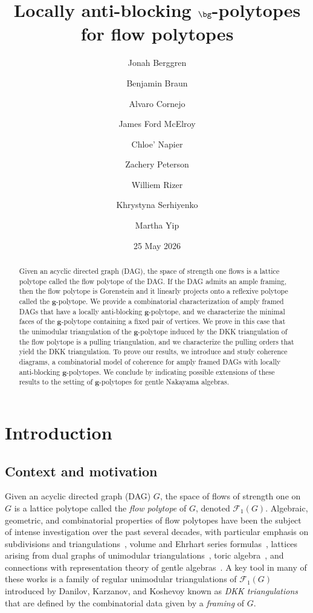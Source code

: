 \documentclass[12pt]{amsart}
\title{Locally anti-blocking $\bg$-polytopes for flow polytopes}
\author[Berggren]{Jonah Berggren}
\author[Braun]{Benjamin Braun}
\author[Cornejo]{Alvaro Cornejo}
\author[McElroy]{James Ford McElroy}
\author[Napier]{Chloe' Napier}
\author[Peterson]{Zachery Peterson}
\author[Rizer]{Williem Rizer}
\author[Serhiyenko]{Khrystyna Serhiyenko}
\author[Yip]{Martha Yip}
\date{25 May 2026}
\theoremstyle{definition}
\newcommand\calF{\mathcal{F}}
\begin{document}
\begin{abstract}
    Given an acyclic directed graph (DAG), the space of strength one flows is a lattice polytope called the flow polytope of the DAG.
    If the DAG admits an ample framing, then the flow polytope is Gorenstein and it linearly projects onto a reflexive polytope called the $\mathbf{g}$-polytope.
    We provide a combinatorial characterization of amply framed DAGs that have a locally anti-blocking $\mathbf{g}$-polytope, and we characterize the minimal faces of the $\mathbf{g}$-polytope containing a fixed pair of vertices.
    We prove in this case that the unimodular triangulation of the $\mathbf{g}$-polytope induced by the DKK triangulation of the flow polytope is a pulling triangulation, and we characterize the pulling orders that yield the DKK triangulation.
    To prove our results, we introduce and study coherence diagrams, a combinatorial model of coherence for amply framed DAGs with locally anti-blocking $\mathbf{g}$-polytopes.
    We conclude by indicating possible extensions of these results to the setting of $\mathbf{g}$-polytopes for gentle Nakayama algebras.
\end{abstract}


\maketitle

\section{Introduction}\label{sec:intro}

\subsection{Context and motivation}

Given an acyclic directed graph (DAG) $G$, the space of flows of strength one on $G$ is a lattice polytope called the \emph{flow polytope} of $G$, denoted $\calF_1(G)$.
Algebraic, geometric, and combinatorial properties of flow polytopes have been the subject of intense investigation over the past several decades, with particular emphasis on subdivisions and triangulations~\cite{BGHHKMY19,berggren2026framingtriangulationsframingposets,berggrenframing,BraunCornejo,DKK12,permutationflows1}, volume and Ehrhart series formulas~\cite{BV08,gensnakeposets,bipartiteflowextensions,braunmcelroy,cryoriginal,GHMY,kms2021,pitmanstanleygeneralized,pitmanstanleyvolumelattice,lidskiiformula,LMS19,LMM16,MM19,MMS19,moralesshi2021,pitmanstanleyoriginal}, lattices arising from dual graphs of unimodular triangulations~\cite{FramingLattices,BGMY23,GMPTY25}, toric algebra~\cite{domokos_equations_toric_2016,HILLE2003215,RietschWilliams_Flow_Toric_2025}, and connections with representation theory of gentle algebras~\cite{gfan_uqam_arxiv,Polytopes2,Berggren,berggrenturbulence,berggrenserhiyenko}.
A key tool in many of these works is a family of regular unimodular triangulations of $\calF_1(G)$ introduced by Danilov, Karzanov, and Koshevoy known as \emph{DKK triangulations}~\cite{DKK12} that are defined by the combinatorial data given by a \emph{framing} of $G$.
\end{document}
